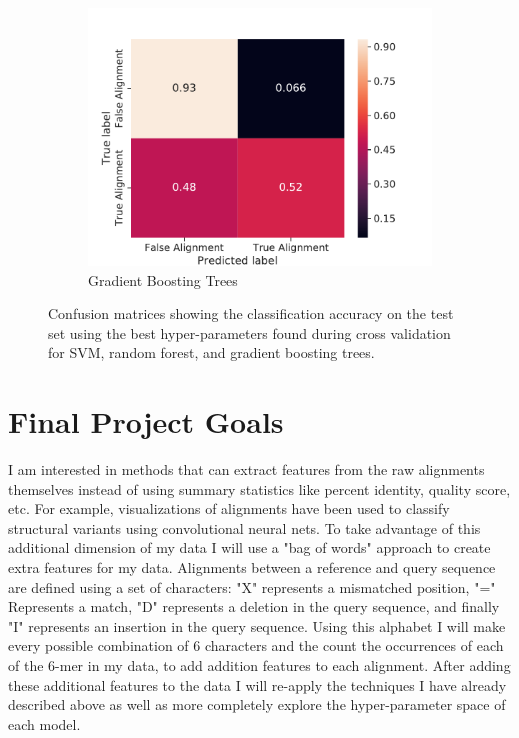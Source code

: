 \documentclass{article}
\begin{document}
\begin{figure}
\begin{subfigure}{.5\textwidth}
  \includegraphics[width=\linewidth]{FinalProject/conf_Gradient_Boosting_Trees.pdf}
\caption{Gradient Boosting Trees}
  \label{fig:sub2}
\end{subfigure}
\caption{Confusion matrices showing the classification accuracy on the test set using the best hyper-parameters found during cross validation for SVM, random forest, and gradient boosting trees. }
\label{fig:conf}
\end{figure}




\section*{Final Project Goals}

I am interested in methods that can extract features from the raw alignments themselves instead of using summary statistics like percent identity, quality score, etc. For example, visualizations of alignments have been used to classify structural variants using convolutional neural nets. To take advantage of this additional dimension of my data I will use a "bag of words" approach to create extra features for my data. Alignments between a reference and query sequence are defined using a set of characters: "X" represents a mismatched position, "=" Represents a match, "D" represents a deletion in the query sequence, and finally "I" represents an insertion in the query sequence. Using this alphabet I will make every possible combination of 6 characters and the count the occurrences of each of the 6-mer in my data, to add addition features to each alignment. After adding these additional features to the data I will re-apply the techniques I have already described above as well as more completely explore the hyper-parameter space of each model.
\end{document}
